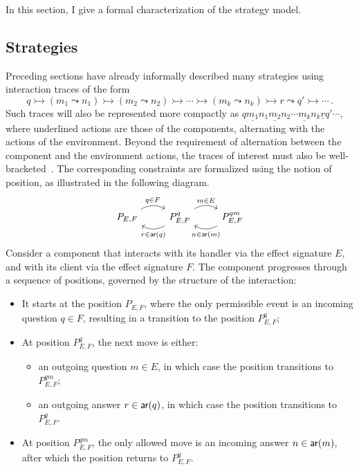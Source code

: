 In this section,
I give a formal characterization of the strategy model.

\subsection{Strategies}

Preceding sections have already informally described many strategies
using interaction traces of the form
\[
  q \rightarrowtail
  (m_1 \leadsto n_1) \rightarrowtail
  (m_2 \leadsto n_2) \rightarrowtail
  \cdots \rightarrowtail
  (m_k \leadsto n_k) \rightarrowtail
  r
  \leadsto
  q' \rightarrowtail
  \cdots
  \,.
\]
Such traces will also be represented more compactly as
$
q \underline{m_1} n_1
\underline{m_2} n_2 \cdots
\underline{m_k} n_k \underline{r}
q' \cdots
$,
where underlined actions
are those of the components,
alternating with the actions of the environment.
Beyond the requirement of alternation
between the component and the environment actions,
the traces of interest
must also be well-bracketed~\citep{gamesemantics}.
The corresponding constraints
are formalized using the notion of position,
as illustrated in the following diagram.
\[
  \begin{tikzcd}
    P_{E,F} \ar[r, bend left, "q \in F"] &
    P_{E,F}^q \ar[r, bend left, "m \in E"] \ar[l, bend left, "r \in \kw{ar}(q)"] &
    P_{E,F}^{qm} \ar[l, bend left, "n \in \kw{ar}(m)"]
  \end{tikzcd}
\]
Consider a component
that interacts with its handler via the effect signature $E$,
and with its client via the effect signature $F$.
The component progresses through a sequence of positions,
governed by the structure of the interaction:
\begin{itemize}
  \item It starts at the position $P_{E,F}$,
    where the only permissible event is
    an incoming question $q \in F$,
    resulting in a transition to the position $P_{E,F}^q$;
  \item At position $P_{E,F}^q$,
    the next move is either:
    \begin{itemize}
      \item an outgoing question $m \in E$,
        in which case the position transitions to $P_{E,F}^{qm}$;
      \item an outgoing answer $r \in  \mathsf{ar} (q)$,
        in which case the position transitions to $P_{E,F}^q$.
    \end{itemize}
  \item At position $P_{E,F}^{qm}$,
    the only allowed move is
    an incoming answer $n \in  \mathsf{ar} (m)$,
    after which the position returns to $P_{E,F}^q$.
\end{itemize}

